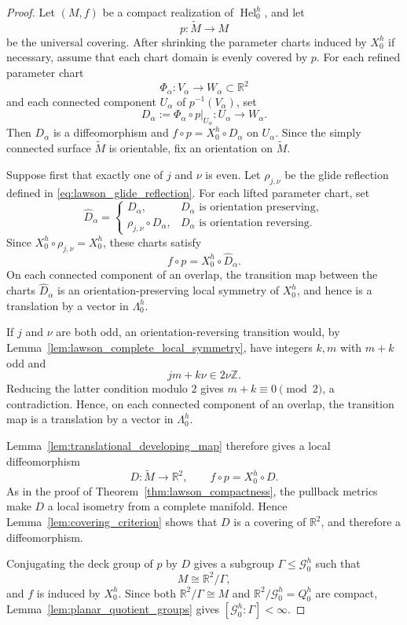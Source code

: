 \documentclass[a4paper,11pt]{amsart}
\numberwithin{equation}{section}
\theoremstyle{plain}
\begin{document}
\begin{proof}
Let $(M,f)$ be a compact realization of
$\operatorname{Hel}_0^h$, and let
\[
p:\widetilde M\longrightarrow M
\]
be the universal covering. After shrinking the parameter charts
induced by $X_0^h$ if necessary, assume that each chart domain is evenly
covered by $p$. For each refined parameter chart
\[
\Phi_\alpha:V_\alpha\longrightarrow W_\alpha\subset\mathbb R^2
\]
and each connected component $U_\alpha$ of $p^{-1}(V_\alpha)$, set
\[
D_\alpha
:=
\Phi_\alpha\circ p|_{U_\alpha}
:
U_\alpha\longrightarrow W_\alpha.
\]
Then $D_\alpha$ is a diffeomorphism and
$f\circ p=X_0^h\circ D_\alpha$ on $U_\alpha$. Since the simply
connected surface $\widetilde M$ is orientable, fix an orientation on
$\widetilde M$.

Suppose first that exactly one of $j$ and $\nu$ is even. Let
$\rho_{j,\nu}$ be the glide reflection defined in
\eqref{eq:lawson_glide_reflection}. For each lifted parameter chart, set
\[
\widehat D_\alpha=
\begin{cases}
D_\alpha,
& D_\alpha\text{ is orientation preserving},\\
\rho_{j,\nu}\circ D_\alpha,
& D_\alpha\text{ is orientation reversing}.
\end{cases}
\]
Since $X_0^h\circ\rho_{j,\nu}=X_0^h$, these charts satisfy
\[
f\circ p=X_0^h\circ\widehat D_\alpha.
\]
On each connected component of an overlap, the transition map between the
charts $\widehat D_\alpha$ is an orientation-preserving local symmetry of
$X_0^h$, and hence is a translation by a vector in $\Lambda_0^h$.

If $j$ and $\nu$ are both odd, an orientation-reversing transition
would, by Lemma~\ref{lem:lawson_complete_local_symmetry}, have integers
$k,m$ with $m+k$ odd and
\[
jm+k\nu\in2\nu\mathbb Z.
\]
Reducing the latter condition modulo $2$ gives
$m+k\equiv0\pmod2$, a contradiction. Hence, on each connected
component of an overlap, the transition map is a translation by a vector in
$\Lambda_0^h$.

Lemma~\ref{lem:translational_developing_map} therefore gives a local
diffeomorphism
\[
D:\widetilde M\longrightarrow\mathbb R^2,
\qquad
f\circ p=X_0^h\circ D.
\]
As in the proof of Theorem~\ref{thm:lawson_compactness}, the pullback
metrics make $D$ a local isometry from a complete manifold. Hence
Lemma~\ref{lem:covering_criterion} shows that $D$ is a covering of
$\mathbb R^2$, and therefore a diffeomorphism.

Conjugating the deck group of $p$ by $D$ gives a subgroup
$\Gamma\leq\mathcal G_0^h$ such that
\[
M\cong\mathbb R^2/\Gamma,
\]
and $f$ is induced by $X_0^h$. Since both $\mathbb R^2/\Gamma\cong M$ and
$\mathbb R^2/\mathcal G_0^h=Q_0^h$ are compact,
Lemma~\ref{lem:planar_quotient_groups} gives
$[\mathcal G_0^h:\Gamma]<\infty$.


\end{proof}
\end{document}
